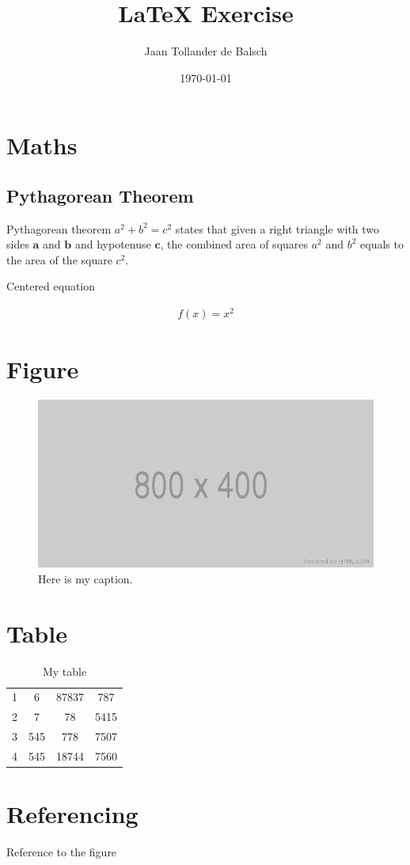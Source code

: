 \documentclass{article}
\title{LaTeX Exercise}
\author{Jaan Tollander de Balsch}
\date{\today}
\begin{document}
\clearpage
\maketitle
\thispagestyle{empty}
\newpage


\thispagestyle{empty}
\tableofcontents{}
\newpage


\section{Maths}
\setcounter{page}{1}

\subsection{Pythagorean Theorem}
Pythagorean theorem $a^2+b^2=c^2$ states that given a right triangle with two sides $\mathbf{a}$ and $\mathbf{b}$ and hypotenuse $\mathbf{c}$, the combined area of squares $a^2$ and $b^2$ equals to the area of the square $c^2$.

Centered equation

\begin{align}
f(x)=x^2
\end{align}


\section{Figure}
\begin{figure}[h]
\includegraphics[width=\textwidth]{800x400.png}
    \caption{Here is my caption. \cite{htmlcom}}
\end{figure}


\section{Table}
\begin{table}[h]
\centering
\begin{tabular}{|c c c c|} 
 \hline
 1 & 6 & 87837 & 787 \\ 
 2 & 7 & 78 & 5415 \\
 3 & 545 & 778 & 7507 \\
 4 & 545 & 18744 & 7560 \\
 \hline
\end{tabular}
\caption{My table}
\label{table:1}
\end{table}


\section{Referencing}
Reference to the figure \cite{htmlcom}

\printbibliography
\end{document}
